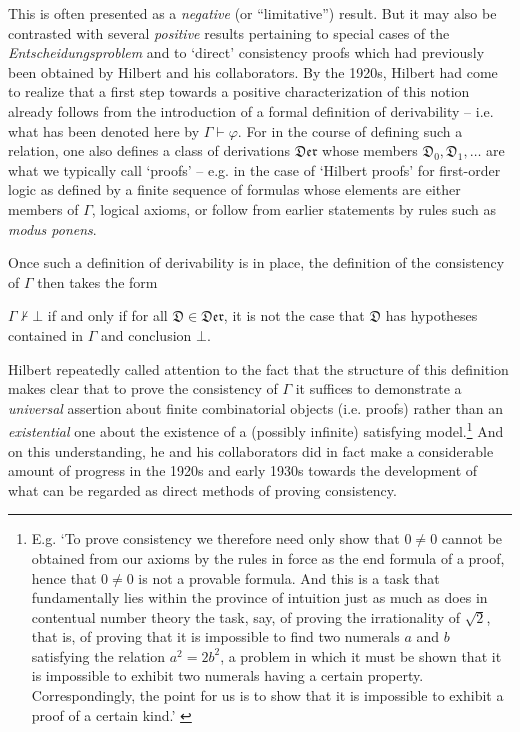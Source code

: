 \documentclass[11pt,fleqn,leqno]{article}
\def\phi{\varphi}
\def\proves{\vdash}
\begin{document}
This is often presented as a \textsl{negative} (or ``limitative'') result.   But it may also be contrasted with several \textsl{positive} results pertaining to special cases of the \textsl{Entscheidungsproblem} and to `direct' consistency proofs which had previously been obtained by Hilbert and his collaborators.  By the 1920s, Hilbert had come to realize that a first step towards a positive characterization of this notion already follows from the introduction of a formal definition of derivability -- i.e. what has been denoted here by $\Gamma \proves \phi$.  For in the course of defining such a relation, one also defines a class of derivations $\mathfrak{Der}$ whose members  $\mathfrak{D}_0,\mathfrak{D}_1,\ldots$ are what we typically call `proofs' --  e.g. in the case of `Hilbert proofs' for first-order logic as defined by \citet{Hilbert1928} a finite sequence of formulas whose elements are either members of $\Gamma$, logical axioms, or follow from earlier statements by rules such as \textsl{modus ponens}.    

Once such a definition of derivability is in place, the definition of the consistency of $\Gamma$ then takes the form
\begin{example}
\label{derdefn}
$\Gamma \not\proves \bot$ if and only if for all $\mathfrak{D} \in \mathfrak{Der}$, it is not the case that $\mathfrak{D}$ has hypotheses contained in $\Gamma$ and conclusion $\bot$.
\end{example}
Hilbert repeatedly called attention to the fact that the structure of this definition makes clear that to prove the consistency of $\Gamma$ it suffices to demonstrate a \textsl{universal} assertion about finite combinatorial objects (i.e. proofs) rather than an \textsl{existential} one about the existence of a (possibly infinite) satisfying model.\footnote{E.g. `To prove consistency we therefore need only show that $0 \neq 0$ cannot be obtained from our axioms by the rules in force as the end formula of a proof, hence that $0 \neq 0$ is not a provable formula. And this is a task that fundamentally lies within the province of intuition just as much as does in contentual number theory the task, say, of proving the irrationality of $\sqrt{2}$, that is, of proving that it is impossible to find two numerals $a$ and $b$ satisfying the relation $a^2 = 2b^2$, a problem in which it must be shown that it is impossible to exhibit two numerals having a certain property.  Correspondingly, the point for us is to show that it is impossible to exhibit a proof of a certain kind.'  \citeyearpar[p. 471]{Hilbert1927} }   And on this understanding, he and his collaborators did in fact make a considerable amount of progress in the 1920s and early 1930s towards the development of what can  be regarded as direct methods of proving consistency.
\end{document}
